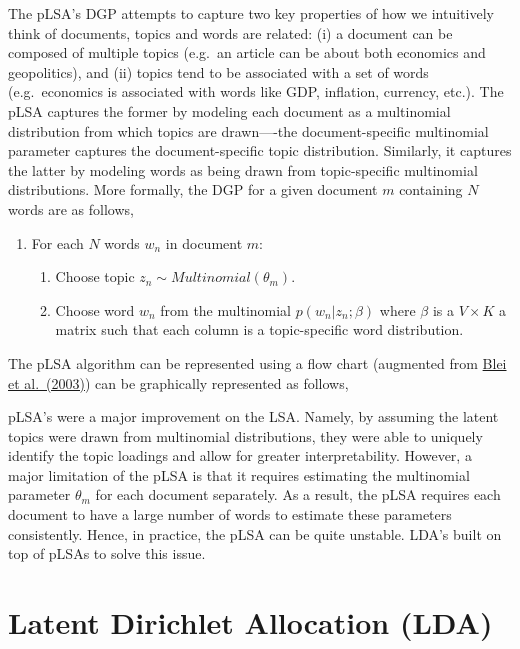 \documentclass[
]{book}
\providecommand{\tightlist}{%
  \setlength{\itemsep}{0pt}\setlength{\parskip}{0pt}}
\begin{document}
The pLSA's DGP attempts to capture two key properties of how we intuitively think of documents, topics and words are related: (i) a document can be composed of multiple topics (e.g.~an article can be about both economics and geopolitics), and (ii) topics tend to be associated with a set of words (e.g.~economics is associated with words like GDP, inflation, currency, etc.). The pLSA captures the former by modeling each document as a multinomial distribution from which topics are drawn----the document-specific multinomial parameter captures the document-specific topic distribution. Similarly, it captures the latter by modeling words as being drawn from topic-specific multinomial distributions. More formally, the DGP for a given document \(m\) containing \(N\) words are as follows,

\begin{enumerate}
\def\labelenumi{\arabic{enumi}.}
\tightlist
\item
  For each \(N\) words \(w_n\) in document \(m\):

  \begin{enumerate}
  \def\labelenumii{\arabic{enumii}.}
  \tightlist
  \item
    Choose topic \(z_{n} \sim Multinomial(\theta_m)\).
  \item
    Choose word \(w_n\) from the multinomial \(p(w_n|z_n;\beta)\) where \(\beta\) is a \(V\times K\) a matrix such that each column is a topic-specific word distribution.
  \end{enumerate}
\end{enumerate}

The pLSA algorithm can be represented using a flow chart (augmented from \href{https://www.jmlr.org/papers/volume3/blei03a/blei03a.pdf}{Blei et al.~(2003)}) can be graphically represented as follows,

pLSA's were a major improvement on the LSA. Namely, by assuming the latent topics were drawn from multinomial distributions, they were able to uniquely identify the topic loadings and allow for greater interpretability. However, a major limitation of the pLSA is that it requires estimating the multinomial parameter \(\theta_m\) for each document separately. As a result, the pLSA requires each document to have a large number of words to estimate these parameters consistently. Hence, in practice, the pLSA can be quite unstable. LDA's built on top of pLSAs to solve this issue.

\hypertarget{latent-dirichlet-allocation-lda}{%
\section{Latent Dirichlet Allocation (LDA)}\label{latent-dirichlet-allocation-lda}}
\end{document}
